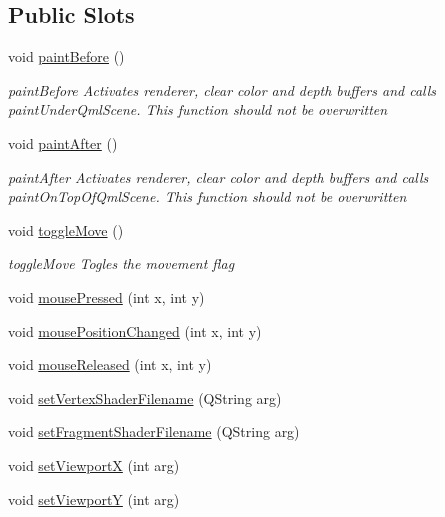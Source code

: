 \subsection*{Public Slots}
\begin{DoxyCompactItemize}
\item 
void \mbox{\hyperlink{class_g_l_item_a1b613d9ef12ba94771b505798170c6e9}{paint\+Before}} ()
\begin{DoxyCompactList}\small\item\em paint\+Before Activates renderer, clear color and depth buffers and calls paint\+Under\+Qml\+Scene. This function should not be overwritten \end{DoxyCompactList}\item 
void \mbox{\hyperlink{class_g_l_item_a146bd63e186b55cbd6ed192706773a24}{paint\+After}} ()
\begin{DoxyCompactList}\small\item\em paint\+After Activates renderer, clear color and depth buffers and calls paint\+On\+Top\+Of\+Qml\+Scene. This function should not be overwritten \end{DoxyCompactList}\item 
void \mbox{\hyperlink{class_g_l_item_acd4f1c0f42402d1cb09e83f1051703cc}{toggle\+Move}} ()
\begin{DoxyCompactList}\small\item\em toggle\+Move Togles the movement flag \end{DoxyCompactList}\item 
void \mbox{\hyperlink{class_g_l_item_aba4710ee3d504c893e493a2a9f48efd0}{mouse\+Pressed}} (int x, int y)
\item 
void \mbox{\hyperlink{class_g_l_item_a52831365074bd5d082de828755ee8954}{mouse\+Position\+Changed}} (int x, int y)
\item 
void \mbox{\hyperlink{class_g_l_item_aca75d031f39c19b86c69042bd39c127a}{mouse\+Released}} (int x, int y)
\item 
void \mbox{\hyperlink{class_g_l_item_afe9282e5b6619800867b757504b036f8}{set\+Vertex\+Shader\+Filename}} (Q\+String arg)
\item 
void \mbox{\hyperlink{class_g_l_item_ad20ccfff6747a45ecd150f870fa832bf}{set\+Fragment\+Shader\+Filename}} (Q\+String arg)
\item 
void \mbox{\hyperlink{class_g_l_item_aacd52a7466b26509442d8f6b80d6e6d9}{set\+ViewportX}} (int arg)
\item 
void \mbox{\hyperlink{class_g_l_item_a9e93a59b34064c9417b3470373b9d0d7}{set\+ViewportY}} (int arg)
\end{DoxyCompactItemize}
